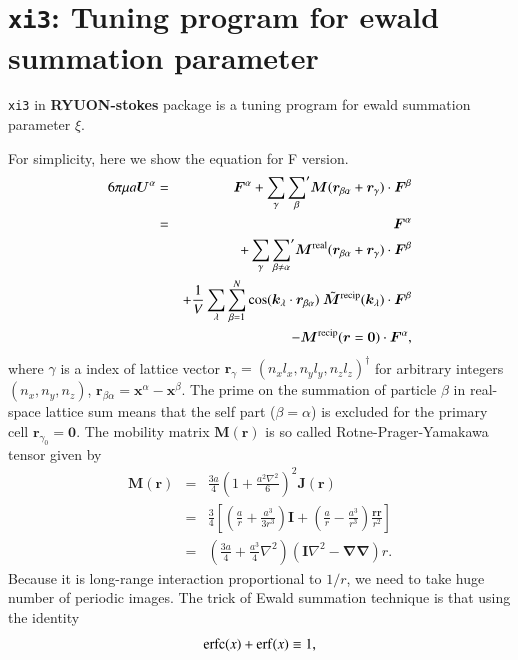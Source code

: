 \documentclass{book}
\begin{document}
\section{{\tt xi3}:
  Tuning program for ewald summation parameter}
{\tt xi3} in {\bf RYUON-stokes} package
is a tuning program for ewald summation parameter $\xi$.

For simplicity, here we show the equation for F version.
\begin{eqnarray}
  6\pi\mu a
  \bm{U}^\alpha
  &=&
  \bm{F}^\alpha
  +
  \sum_{\gamma}
  {\sum_{\beta}}'
  \bm{M}(\bm{r}_{\beta\alpha} + \bm{r}_\gamma)
  \cdot\bm{F}^\beta
  \\
  &=&
  \bm{F}^\alpha
  \\
  &&
  +
  \sum_{\gamma}
  {\sum_{\beta\neq\alpha}}'
  \bm{M}^{\rm real}(\bm{r}_{\beta\alpha} + \bm{r}_\gamma)
  \cdot\bm{F}^\beta
  \\
  &&
  +
  \frac{1}{V}
  \sum_{\lambda}
  \sum_{\beta = 1}^{N}
  \cos(\bm{k}_\lambda\cdot\bm{r}_{\beta\alpha})\ 
  \tilde{\bm{M}}^{\rm recip}(\bm{k}_\lambda)
  \cdot\bm{F}^\beta
  \\
  &&
  -
  \bm{M}^{\rm recip}(\bm{r} = \bm{0})
  \cdot\bm{F}^\alpha
  ,
\end{eqnarray}
where $\gamma$ is a index of lattice vector
$\bm{r}_\gamma = (n_x l_x, n_y l_y, n_z l_z)^\dagger$
for arbitrary integers $(n_x, n_y, n_z)$,
$\bm{r}_{\beta\alpha} = \bm{x}^\alpha - \bm{x}^\beta$.
The prime on the summation of particle $\beta$ in real-space lattice sum
means that the self part ($\beta = \alpha$) is excluded
for the primary cell $\bm{r}_{\gamma_0} = \bm{0}$.
The mobility matrix $\bm{M}(\bm{r})$ is so called
Rotne-Prager-Yamakawa tensor given by
\begin{eqnarray}
  \bm{M}(\bm{r})
  &=&
  \frac{3a}{4}
  \left(
    1
    +
    \frac{a^2\nabla^2}{6}
  \right)^2
  \bm{J}(\bm{r})
  \\
  &=&
  \frac{3}{4}
  \left[
  \left(
    \frac{a}{r}
    +
    \frac{a^3}{3r^3}
  \right)
  \bm{I}
  +
  \left(
    \frac{a}{r}
    -
    \frac{a^3}{r^3}
  \right)
  \frac{\bm{rr}}{r^2}
  \right]
  \\
  &=&
  \left(
    \frac{3a}{4}
    +
    \frac{a^3}{4}
    \nabla^2
  \right)
  \left(
    \bm{I}
    \nabla^2
    -
    \bm{\nabla\nabla}
  \right)
  r
  .
\end{eqnarray}
Because it is long-range interaction proportional to $1/r$,
we need to take huge number of periodic images.
The trick of Ewald summation technique is that
using the identity
\begin{equation}
  {\rm erfc}(x) + {\rm erf}(x) \equiv 1,
\end{equation}
\end{document}
